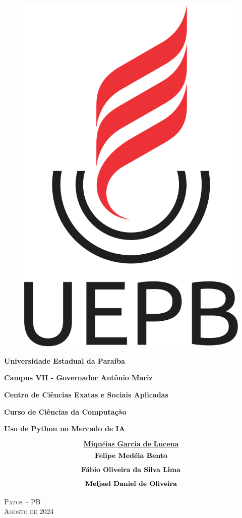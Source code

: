 \thispagestyle{empty}
\begin{center}

\begin{singlespace}
\begin{figure}[!htb]
    \centering
    \includegraphics[width=0.1\linewidth]{img/logo-uepb.png}
\end{figure}
{\Large{\textbf{ Universidade Estadual da Paraíba }}}

{\large{\textbf{ Campus VII - Governador Antônio Mariz }}}

{\large{\textbf{ Centro de Ciências Exatas e Sociais Aplicadas }}}

{\large{\textbf{ Curso de Ciências da Computação }}}
\end{singlespace}


\vspace{4.0cm}

\textbf{ \huge{{ Uso de Python no Mercado de IA }}}

\vspace {3cm}

\href{}
{\Large{$$\textbf {Miquéias Garcia de Lucena}$$$$\newline\textbf {Felipe Medéia Bento}$$$$\newline\textbf {Fábio Oliveira da Silva Lima}$$$$\newline\textbf {Meljael Daniel de Oliveira}$$}}

\vspace{3cm}

\begin{singlespace}

\large{\textsc{Patos -- PB}}\\
\large{\textsc{Agosto de 2024}}

\end{singlespace}

\end{center}

\pagebreak


\thispagestyle{empty}

